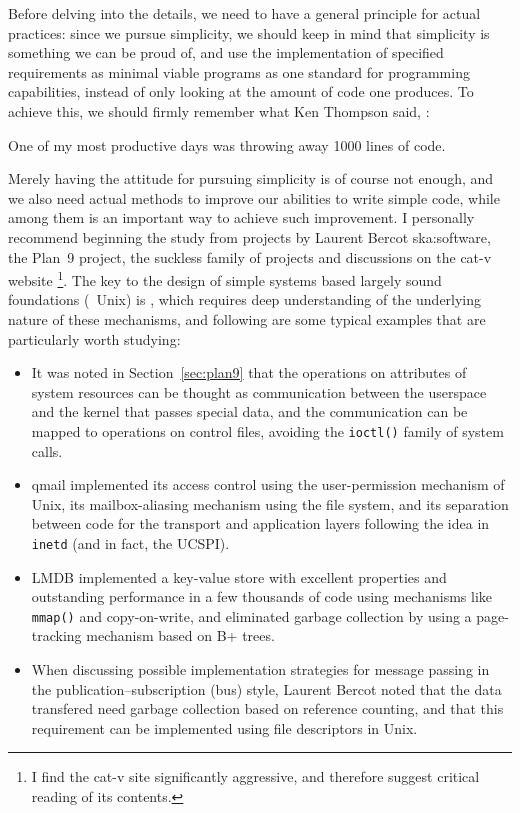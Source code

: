 Before delving into the details, we need to have a general principle for
actual practices: since we pursue simplicity, we should keep in mind that
simplicity is something we can be proud of, and use the implementation of
specified requirements as minimal viable programs
as one standard for programming capabilities, instead of only looking
at the amount of code one produces.  To achieve this, we should firmly
remember what Ken Thompson said, :
\begin{quoting}
	One of my most productive days was throwing away 1000 lines of code.
\end{quoting}
Merely having the attitude for pursuing simplicity is of course not enough, and
we also need actual methods to improve our abilities to write simple code, while
among them  is an important way to achieve such improvement.  I personally
recommend beginning the study from projects by Laurent Bercot\cupercite%
{ska:software}, the Plan~9 project, the suckless family
of projects and discussions on the cat-v website%
\footnote{I find the cat-v site significantly aggressive,
and therefore suggest critical reading of its contents.}.  The key to
the design of simple systems based largely sound foundations (\eg~Unix)
is , which requires deep
understanding of the underlying nature of these mechanisms, and following
are some typical examples that are particularly worth studying:
\begin{itemize}
\item It was noted in Section~\ref{sec:plan9} that the operations on
	attributes of system resources can be thought as communication
	between the userspace and the kernel that passes special data,
	and the communication can be mapped to operations on control
	files, avoiding the \verb|ioctl()| family of system calls.
\item qmail implemented its access control
	using the user-permission mechanism of Unix, its mailbox-aliasing
	mechanism using the file system, and its separation between code
	for the transport and application layers following the idea in
	\verb|inetd| (and in fact, the UCSPI).
\item LMDB implemented a key-value store with excellent
	properties and outstanding performance in a few thousands of code using
	mechanisms like \verb|mmap()| and copy-on-write, and eliminated garbage
	collection by using a page-tracking mechanism based on B+ trees.
\item When discussing possible implementation strategies for message
	passing in the publication--subscription (bus) style, Laurent Bercot
	noted that the data transfered need garbage
	collection based on reference counting, and that this requirement
	can be implemented using file descriptors in Unix.
\end{itemize}

